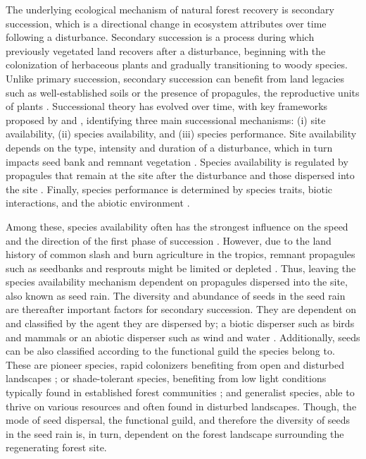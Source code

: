 The underlying ecological mechanism of natural forest recovery is secondary succession, which is a directional change in ecosystem attributes over time following a disturbance. Secondary succession is a process during which previously vegetated land recovers after a disturbance, beginning with the colonization of herbaceous plants and gradually transitioning to woody species. Unlike primary succession, secondary succession can benefit from land legacies such as well-established soils or the presence of propagules, the reproductive units of plants \citep{poorterSuccessionalTheories2023}. %
Successional theory has evolved over time, with 
key frameworks proposed by \citet{pickettHierarchicalConsiderationCauses1987} and \citet{poorterComprehensiveFrameworkVegetation2024}, identifying three main successional mechanisms: (i) site availability, (ii) species availability, and (iii) species performance. Site availability depends on the type, intensity and duration of a disturbance, which in turn impacts seed bank and remnant vegetation \citep{poorterComprehensiveFrameworkVegetation2024}. Species availability is regulated by propagules that remain at the site after the disturbance and those dispersed into the site \citep{gleasonIndividualisticConceptPlant1926, dentUnitingNicheDifferentiation2021}. Finally, species performance is determined by species traits, biotic interactions, and the abiotic environment \citep{poorterComprehensiveFrameworkVegetation2024}. 

Among these, species availability often has the strongest influence on the speed and the direction of the first phase of succession \citep{poorterSuccessionalTheories2023, dentUnitingNicheDifferentiation2021}. However, due to the land history of common slash and burn agriculture in the tropics, remnant propagules such as seedbanks and resprouts might be limited or depleted \citep{bezerraDrasticImpoverishmentSoil2022}. Thus, leaving the species availability mechanism dependent on propagules dispersed into the site, also known as seed rain. The diversity and abundance of seeds in the seed rain are thereafter important factors for secondary succession. They are dependent on and classified by the agent they are dispersed by; a biotic disperser such as birds and mammals or an abiotic disperser such as wind and water \citep{poorterComprehensiveFrameworkVegetation2024}. Additionally, seeds can be also classified according to the functional guild the species belong to. These are pioneer species, rapid colonizers benefiting from open and disturbed landscapes \citep{poorterComprehensiveFrameworkVegetation2024}; or shade-tolerant species, benefiting from low light conditions typically found in established forest communities \citep{dentUnitingNicheDifferentiation2021}; and generalist species, able to thrive on various resources and often found in disturbed landscapes. Though, the mode of seed dispersal, the functional guild, and therefore the diversity of seeds in the seed rain is, in turn, dependent on the forest landscape surrounding the regenerating forest site. 

